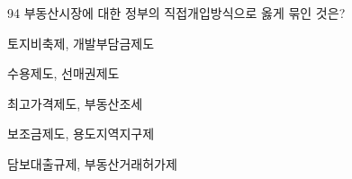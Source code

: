 \begin{question}{94}
부동산시장에 대한 정부의 직접개입방식으로 옳게 묶인 것은?
\begin{choices}
  \item 토지비축제, 개발부담금제도
  \item 수용제도, 선매권제도
  \item 최고가격제도, 부동산조세
  \item 보조금제도, 용도지역지구제
  \item 담보대출규제, 부동산거래허가제
\end{choices}
\end{question}
